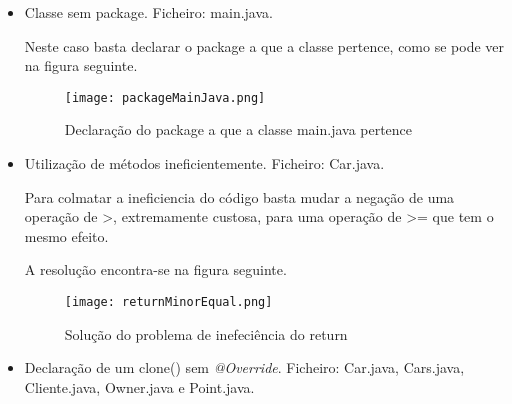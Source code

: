 \begin{itemize}
\begin{itemize}
\item Classe sem package.\newline
 Ficheiro: main.java.\newline


\par Neste caso basta declarar o package a que a classe pertence, como se pode ver na figura seguinte.\newline 

\begin{figure}[H]

  \centering

  \texttt{[image: packageMainJava.png]}

  \caption {Declaração do package a que a classe main.java pertence}

  \label {fig12}

\end{figure}

\end{itemize}

\begin{itemize}
\item Utilização de métodos ineficientemente.\newline
 Ficheiro: Car.java.\newline


\par Para colmatar a ineficiencia do código basta mudar a negação de uma operação de >, extremamente custosa, para uma operação de >= que tem o mesmo efeito.\newline
\par A resolução encontra-se na figura seguinte. 
\begin{figure}[H]

  \centering

  \texttt{[image: returnMinorEqual.png]}

  \caption {Solução do problema de inefeciência do return}

  \label {fig13}

\end{figure}

\end{itemize}

\begin{itemize}
\item Declaração de um clone() sem \textit{@Override}.\newline
 Ficheiro: Car.java, Cars.java, Cliente.java, Owner.java e Point.java.\newline



\end{itemize}
\end{itemize}
